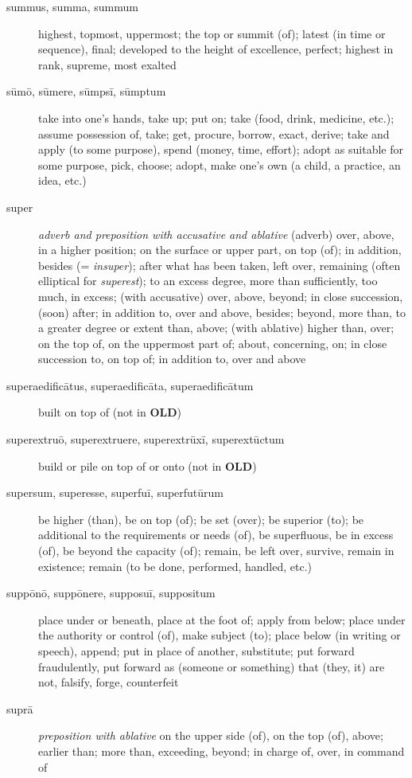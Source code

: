 \begin{description}
    \item[summus, summa, summum] highest, topmost, uppermost; the top or summit (of); latest (in time or sequence), final; developed to the height of excellence, perfect; highest in rank, supreme, most exalted
    \item[sūmō, sūmere, sūmpsī, sūmptum] take into one's hands, take up; put on; take (food, drink, medicine, etc.); assume possession of, take; get, procure, borrow, exact, derive; take and apply (to some purpose), spend (money, time, effort); adopt as suitable for some purpose, pick, choose; adopt, make one's own (a child, a practice, an idea, etc.)
    \item[super] \textit{adverb and preposition with accusative and ablative} (adverb) over, above, in a higher position; on the surface or upper part, on top (of); in addition, besides (= \textit{insuper}); after what has been taken, left over, remaining (often elliptical for \textit{superest}); to an excess degree, more than sufficiently, too much, in excess; (with accusative) over, above, beyond; in close succession, (soon) after; in addition to, over and above, besides; beyond, more than, to a greater degree or extent than, above; (with ablative) higher than, over; on the top of, on the uppermost part of; about, concerning, on; in close succession to, on top of; in addition to, over and above
    \item[superaedificātus, superaedificāta, superaedificātum] built on top of (not in \textbf{OLD})
    \item[superextruō, superextruere, superextrūxī, superextūctum] build or pile on top of or onto (not in \textbf{OLD})
    \item[supersum, superesse, superfuī, superfutūrum] be higher (than), be on top (of); be set (over); be superior (to); be additional to the requirements or needs (of), be superfluous, be in excess (of), be beyond the capacity (of); remain, be left over, survive, remain in existence; remain (to be done, performed, handled, etc.)
    \item[suppōnō, suppōnere, supposuī, suppositum] place under or beneath, place at the foot of; apply from below; place under the authority or control (of), make subject (to); place below (in writing or speech), append; put in place of another, substitute; put forward fraudulently, put forward as (someone or something) that (they, it) are not, falsify, forge, counterfeit
    \item[suprā] \textit{preposition with ablative} on the upper side (of), on the top (of), above; earlier than; more than, exceeding, beyond; in charge of, over, in command of

\end{description}
